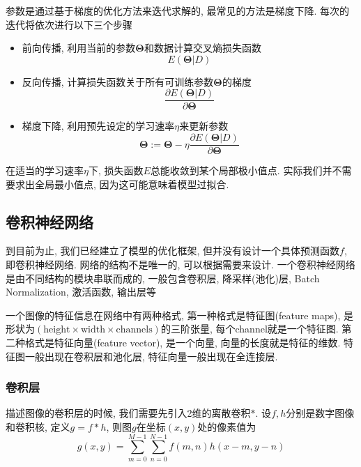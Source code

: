 参数是通过基于梯度的优化方法来迭代求解的, 最常见的方法是梯度下降. 每次的迭代将依次进行以下三个步骤
\begin{itemize}
    \item 前向传播, 利用当前的参数$\boldsymbol{\Theta}$和数据计算交叉熵损失函数
        \begin{equation*}
            E(\boldsymbol{\Theta}|D)
        \end{equation*}
    \item 反向传播, 计算损失函数关于所有可训练参数$\boldsymbol{\Theta}$的梯度
        \begin{equation*}
            \frac{\partial E(\boldsymbol{\Theta} | D)}{\partial \boldsymbol{\Theta}}
        \end{equation*}
    \item 梯度下降, 利用预先设定的学习速率$\eta$来更新参数
        \begin{equation*}
            \boldsymbol{\Theta} := \boldsymbol{\Theta} - \eta \frac{\partial E(\boldsymbol{\Theta} | D)}{\partial \boldsymbol{\Theta}}
        \end{equation*}
\end{itemize}
在适当的学习速率$\eta$下, 损失函数$E$总能收敛到某个局部极小值点. 实际我们并不需要求出全局最小值点, 因为这可能意味着模型过拟合.

\subsection{卷积神经网络}
到目前为止, 我们已经建立了模型的优化框架, 但并没有设计一个具体预测函数$f$, 即卷积神经网络. 网络的结构不是唯一的, 可以根据需要来设计. 一个卷积神经网络是由不同结构的模块串联而成的, 一般包含卷积层, 降采样(池化)层, Batch Normalization, 激活函数, 输出层等

一个图像的特征信息在网络中有两种格式, 第一种格式是特征图(feature maps), 是形状为$(\text{height}\times \text{width} \times \text{channels})$的三阶张量, 每个channel就是一个特征图. 第二种格式是特征向量(feature vector), 是一个向量, 向量的长度就是特征的维数. 特征图一般出现在卷积层和池化层, 特征向量一般出现在全连接层.

\subsubsection{卷积层}
描述图像的卷积层的时候, 我们需要先引入2维的离散卷积$*$. 设$f, h$分别是数字图像和卷积核, 定义$g = f * h$, 则图$g$在坐标$(x, y)$处的像素值为
\begin{equation}
    g(x, y) = \sum_{m=0}^{M-1} \sum_{n=0}^{N-1} f(m, n) h(x - m, y - n)
\end{equation}


